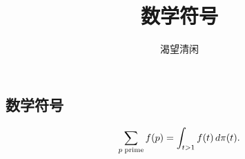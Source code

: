 ﻿\documentclass{article}
\begin{document}
\begin{CJK*}{UTF8}{gbsn}                          %
\title{数学符号}
\author{渴望清闲}
\maketitle
\section{数学符号}
   $$\sum_{p\rm\;prime}f(p) = \int_{t>1}f(t)\,d\pi(t).$$
\end{CJK*}
\end{document}
